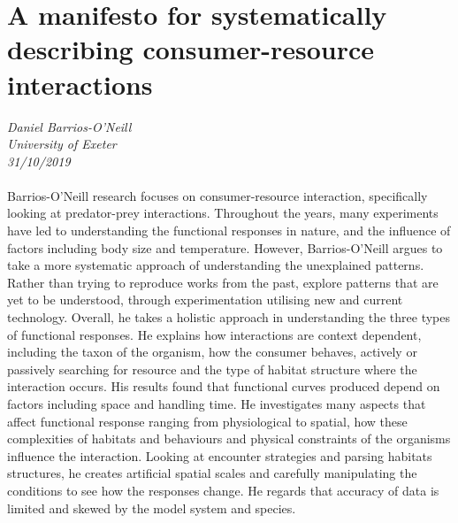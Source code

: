 \documentclass[11pt]{article}
\begin{document}
\section{A manifesto for systematically describing consumer-resource interactions}
\textit{Daniel Barrios-O’Neill\\University of Exeter\\31/10/2019}
\\
\\Barrios-O’Neill research focuses on consumer-resource interaction, specifically looking at predator-prey interactions. Throughout the years, many experiments have led to understanding the functional responses in nature, and the influence of factors including body size and temperature. However, Barrios-O’Neill argues to take a more systematic approach of understanding the unexplained patterns. Rather than trying to reproduce works from the past, explore patterns that are yet to be understood, through experimentation utilising new and current technology. Overall, he takes a holistic approach in understanding the three types of functional responses. He explains how interactions are context dependent, including the taxon of the organism, how the consumer behaves, actively or passively searching for resource and the type of habitat structure where the interaction occurs. His results found that functional curves produced depend on factors including space and handling time. He investigates many aspects that affect functional response ranging from physiological to spatial, how these complexities of habitats and behaviours and physical constraints of the organisms influence the interaction. Looking at encounter strategies and parsing habitats structures, he creates artificial spatial scales and carefully manipulating the conditions to see how the responses change. He regards that accuracy of data is limited and skewed by the model system and species.
\end{document}
